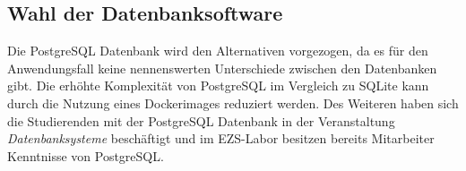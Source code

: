 \subsection{Wahl der Datenbanksoftware}
Die PostgreSQL Datenbank wird den Alternativen vorgezogen, da es für den Anwendungsfall keine nennenswerten Unterschiede zwischen den Datenbanken gibt. Die erhöhte Komplexität von PostgreSQL im Vergleich zu SQLite kann durch die Nutzung eines Dockerimages reduziert werden. Des Weiteren haben sich die Studierenden mit der PostgreSQL Datenbank in der Veranstaltung \textit{Datenbanksysteme} beschäftigt und im EZS-Labor besitzen bereits Mitarbeiter Kenntnisse von PostgreSQL.
